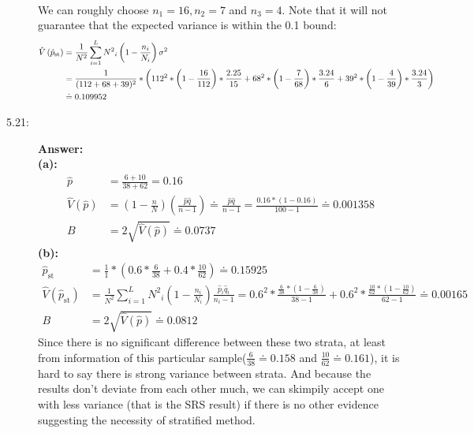 \documentclass{article}
\begin{document}
\begin{description}
\begin{align}
        \end{align}
        We can roughly choose $n_1=16, n_2=7$ and $n_3=4$. Note that it will not guarantee that the expected variance is within the 0.1 bound:
        \begin{align}
          \hat{V}\left(\hat{p}_{\text{st}}\right)
          &=\frac{1}{N^2}\sum _{i=1}^L N^2{}_i\left(1-\frac{n_i}{N_i}\right)\sigma ^2\\ \notag
          &=\frac{1}{(112+68+39)^2}*\left(112^2*\left(1-\frac{16}{112}\right)*\frac{2.25}{15}+68^2*\left(1-\frac{7}{68}\right)*\frac{3.24}{6}+39^2*\left(1-\frac{4}{39}\right)*\frac{3.24}{3}\right)\\ \notag
          &\doteq0.109952
        \end{align}
    \item[5.21:]{\bf Answer:}\\
        {\bf (a):}
            \begin{align}
                \hat{p}&=\frac{6+10}{38+62}=0.16\\
                \hat{V}\left(\hat{p}\right)&=\left(1-\frac{n}{N}\right)\left(\frac{\hat{p}\hat{q}}{n-1}\right)\doteq \frac{\hat{p}\hat{q}}{n-1}=\frac{0.16*(1-0.16)}{100-1}\doteq 0.001358\\
                B&=2\sqrt{\hat{V}\left(\hat{p}\right)}\doteq 0.0737
                \end{align}
        {\bf (b):}
            \begin{align}
              \hat{p}_{\text{st}}&=\frac{1}{1}*\left(0.6*\frac{6}{38}+0.4*\frac{10}{62}\right)\doteq 0.15925\\
              \hat{V}\left(\hat{p}_{\text{st}}\right)&=\frac{1}{N^2}\sum _{i=1}^L N^2{}_i\left(1-\frac{n_i}{N_i}\right)\frac{\hat{p}_i\hat{q}_i}{n_i-1}=0.6^2*\frac{\frac{6}{38}*\left(1-\frac{6}{38}\right)}{38-1}+0.6^2*\frac{\frac{10}{62}*\left(1-\frac{10}{62}\right)}{62-1}\doteq 0.00165\\
              B&=2\sqrt{\hat{V}\left(\hat{p}\right)}\doteq 0.0812
            \end{align}
            Since there is no significant difference between these two strata, at least from information of this particular sample($\frac{6}{38}\doteq 0.158$ and $\frac{10}{62}\doteq 0.161$), it is hard to say there is strong variance between strata. And because the results don't deviate from each other much, we can skimpily accept one with less variance (that is the SRS result) if there is no other evidence suggesting the necessity of stratified method.\\\\

\end{description}
\end{document}
